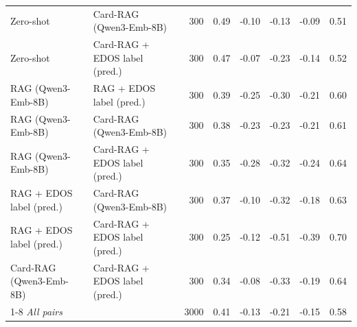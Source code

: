 \begin{table}[t]
{\begin{tabular}{llrrrrrr}
Zero-shot & Card-RAG (Qwen3-Emb-8B) & 300 & 0.49 & -0.10 & -0.13 & -0.09 & 0.51 \\
Zero-shot & Card-RAG + EDOS label (pred.) & 300 & 0.47 & -0.07 & -0.23 & -0.14 & 0.52 \\
RAG (Qwen3-Emb-8B) & RAG + EDOS label (pred.) & 300 & 0.39 & -0.25 & -0.30 & -0.21 & 0.60 \\
RAG (Qwen3-Emb-8B) & Card-RAG (Qwen3-Emb-8B) & 300 & 0.38 & -0.23 & -0.23 & -0.21 & 0.61 \\
RAG (Qwen3-Emb-8B) & Card-RAG + EDOS label (pred.) & 300 & 0.35 & -0.28 & -0.32 & -0.24 & 0.64 \\
RAG + EDOS label (pred.) & Card-RAG (Qwen3-Emb-8B) & 300 & 0.37 & -0.10 & -0.32 & -0.18 & 0.63 \\
RAG + EDOS label (pred.) & Card-RAG + EDOS label (pred.) & 300 & 0.25 & -0.12 & -0.51 & -0.39 & 0.70 \\
Card-RAG (Qwen3-Emb-8B) & Card-RAG + EDOS label (pred.) & 300 & 0.34 & -0.08 & -0.33 & -0.19 & 0.64 \\
\cmidrule(lr){1-8}
\textit{All pairs} &  & 3000 & 0.41 & -0.13 & -0.21 & -0.15 & 0.58 \\
\bottomrule
\end{tabular}%
}
\end{table}
